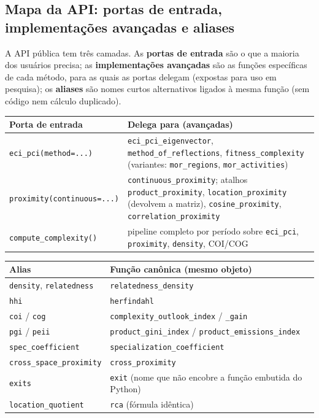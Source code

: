 \documentclass[12pt, a4paper]{article}
\begin{document}
\subsection{Mapa da API: portas de entrada, implementa\c{c}\~{o}es avan\c{c}adas e aliases}

A API p\'{u}blica tem tr\^{e}s camadas. As \textbf{portas de entrada}
s\~{a}o o que a maioria dos usu\'{a}rios precisa; as
\textbf{implementa\c{c}\~{o}es avan\c{c}adas} s\~{a}o as fun\c{c}\~{o}es
espec\'{i}ficas de cada m\'{e}todo, para as quais as portas delegam
(expostas para uso em pesquisa); os \textbf{aliases} s\~{a}o nomes curtos
alternativos ligados \`{a} mesma fun\c{c}\~{a}o (sem c\'{o}digo nem
c\'{a}lculo duplicado).

\begin{center}
\renewcommand{\arraystretch}{1.3}
\small
\begin{tabular}{>{\raggedright\arraybackslash}p{5.2cm}>{\raggedright\arraybackslash}p{10.4cm}}
\toprule
\textbf{Porta de entrada} & \textbf{Delega para (avan\c{c}adas)} \\
\midrule
\texttt{eci\_pci(method=...)} & \texttt{eci\_pci\_eigenvector},
  \texttt{method\_of\_reflections}, \texttt{fitness\_complexity}
  (variantes: \texttt{mor\_regions}, \texttt{mor\_activities}) \\
\texttt{proximity(continuous=...)} &
  \texttt{continuous\_proximity}; atalhos \texttt{product\_proximity}, \texttt{location\_proximity} (devolvem a matriz), \texttt{cosine\_proximity},
  \texttt{correlation\_proximity} \\
\texttt{compute\_complexity()} & pipeline completo por per\'{i}odo sobre
  \texttt{eci\_pci}, \texttt{proximity}, \texttt{density}, COI/COG \\
\bottomrule
\end{tabular}
\end{center}

\begin{center}
\renewcommand{\arraystretch}{1.3}
\begin{tabular}{ll}
\toprule
\textbf{Alias} & \textbf{Fun\c{c}\~{a}o can\^{o}nica (mesmo objeto)} \\
\midrule
\texttt{density}, \texttt{relatedness} & \texttt{relatedness\_density} \\
\texttt{hhi}                  & \texttt{herfindahl} \\
\texttt{coi} / \texttt{cog}   & \texttt{complexity\_outlook\_index} / \texttt{\_gain} \\
\texttt{pgi} / \texttt{peii}  & \texttt{product\_gini\_index} / \texttt{product\_emissions\_index} \\
\texttt{spec\_coefficient}    & \texttt{specialization\_coefficient} \\
\texttt{cross\_space\_proximity} & \texttt{cross\_proximity} \\
\texttt{exits} & \texttt{exit} (nome que n\~{a}o encobre a fun\c{c}\~{a}o embutida do Python) \\
\texttt{location\_quotient}   & \texttt{rca} (f\'{o}rmula id\^{e}ntica) \\
\bottomrule
\end{tabular}
\end{center}
\end{document}
